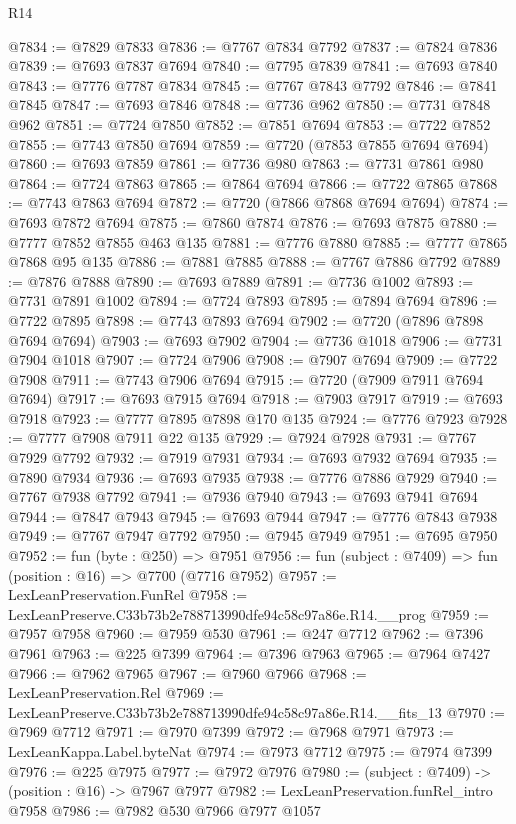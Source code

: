\begin{lexlean}{R14}
\begin{coremodule}
@7834 := @7829 @7833
@7836 := @7767 @7834 @7792
@7837 := @7824 @7836
@7839 := @7693 @7837 @7694
@7840 := @7795 @7839
@7841 := @7693 @7840
@7843 := @7776 @7787 @7834
@7845 := @7767 @7843 @7792
@7846 := @7841 @7845
@7847 := @7693 @7846
@7848 := @7736 @962
@7850 := @7731 @7848 @962
@7851 := @7724 @7850
@7852 := @7851 @7694
@7853 := @7722 @7852
@7855 := @7743 @7850 @7694
@7859 := @7720 (@7853 @7855 @7694 @7694)
@7860 := @7693 @7859
@7861 := @7736 @980
@7863 := @7731 @7861 @980
@7864 := @7724 @7863
@7865 := @7864 @7694
@7866 := @7722 @7865
@7868 := @7743 @7863 @7694
@7872 := @7720 (@7866 @7868 @7694 @7694)
@7874 := @7693 @7872 @7694
@7875 := @7860 @7874
@7876 := @7693 @7875
@7880 := @7777 @7852 @7855 @463 @135
@7881 := @7776 @7880
@7885 := @7777 @7865 @7868 @95 @135
@7886 := @7881 @7885
@7888 := @7767 @7886 @7792
@7889 := @7876 @7888
@7890 := @7693 @7889
@7891 := @7736 @1002
@7893 := @7731 @7891 @1002
@7894 := @7724 @7893
@7895 := @7894 @7694
@7896 := @7722 @7895
@7898 := @7743 @7893 @7694
@7902 := @7720 (@7896 @7898 @7694 @7694)
@7903 := @7693 @7902
@7904 := @7736 @1018
@7906 := @7731 @7904 @1018
@7907 := @7724 @7906
@7908 := @7907 @7694
@7909 := @7722 @7908
@7911 := @7743 @7906 @7694
@7915 := @7720 (@7909 @7911 @7694 @7694)
@7917 := @7693 @7915 @7694
@7918 := @7903 @7917
@7919 := @7693 @7918
@7923 := @7777 @7895 @7898 @170 @135
@7924 := @7776 @7923
@7928 := @7777 @7908 @7911 @22 @135
@7929 := @7924 @7928
@7931 := @7767 @7929 @7792
@7932 := @7919 @7931
@7934 := @7693 @7932 @7694
@7935 := @7890 @7934
@7936 := @7693 @7935
@7938 := @7776 @7886 @7929
@7940 := @7767 @7938 @7792
@7941 := @7936 @7940
@7943 := @7693 @7941 @7694
@7944 := @7847 @7943
@7945 := @7693 @7944
@7947 := @7776 @7843 @7938
@7949 := @7767 @7947 @7792
@7950 := @7945 @7949
@7951 := @7695 @7950
@7952 := fun (byte : @250) => @7951
@7956 := fun (subject : @7409) => fun (position : @16) => @7700 (@7716 @7952)
@7957 := LexLeanPreservation.FunRel
@7958 := LexLeanPreserve.C33b73b2e788713990dfe94c58c97a86e.R14.__prog
@7959 := @7957 @7958
@7960 := @7959 @530
@7961 := @247 @7712
@7962 := @7396 @7961
@7963 := @225 @7399
@7964 := @7396 @7963
@7965 := @7964 @7427
@7966 := @7962 @7965
@7967 := @7960 @7966
@7968 := LexLeanPreservation.Rel
@7969 := LexLeanPreserve.C33b73b2e788713990dfe94c58c97a86e.R14.__fits_13
@7970 := @7969 @7712
@7971 := @7970 @7399
@7972 := @7968 @7971
@7973 := LexLeanKappa.Label.byteNat
@7974 := @7973 @7712
@7975 := @7974 @7399
@7976 := @225 @7975
@7977 := @7972 @7976
@7980 := (subject : @7409) -> (position : @16) -> @7967 @7977
@7982 := LexLeanPreservation.funRel_intro @7958
@7986 := @7982 @530 @7966 @7977 @1057

\end{coremodule}
\end{lexlean}
